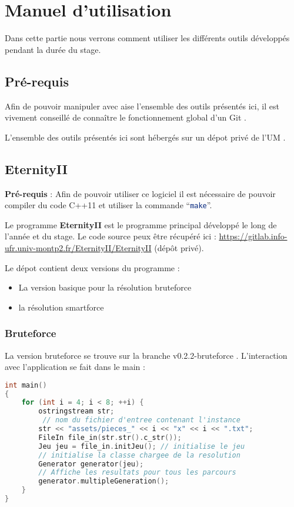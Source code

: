 \section{Manuel d'utilisation}

Dans cette partie nous verrons comment utiliser les différents outils développés pendant la durée du stage.

	\subsection{Pré-requis}
	
	Afin de pouvoir manipuler avec aise l'ensemble des outils présentés ici, il est vivement conseillé de connaître le fonctionnement global d'un Git \autocite{git}.
	
	L'ensemble des outils présentés ici sont hébergés sur un dépot privé de l'UM \autocite{gitlab:eternity}.

	\subsection{EternityII}
	
	\textbf{Pré-requis} : Afin de pouvoir utiliser ce logiciel il est nécessaire de pouvoir compiler du code C++11 et utiliser la commande \enquote{\lstinline[columns=fixed,language=bash]{make}}.
	
	Le programme \textbf{EternityII} est le programme principal développé le long de l'année et du stage. Le code source peux être récupéré ici : \url{https://gitlab.info-ufr.univ-montp2.fr/EternityII/EternityII} (dépôt privé).
	
	Le dépot contient deux versions du programme :
	
	\begin{itemize}
		\item La version basique pour la résolution bruteforce
		\item la résolution smartforce
	\end{itemize}

	\subsubsection{Bruteforce}
	
	La version bruteforce se trouve sur la branche v0.2.2-bruteforce \autocite{gitlab:eternity_bruteforce}. L'interaction avec l'application se fait dans le main :
	
	\begin{lstlisting}[language=c++, caption={Parcours bruteforce sur plusieurs tailles du plateau, en affichant tous les résultats des différents parcours}]
int main()
{
    for (int i = 4; i < 8; ++i) {
        ostringstream str;
         // nom du fichier d'entree contenant l'instance
        str << "assets/pieces_" << i << "x" << i << ".txt";
        FileIn file_in(str.str().c_str());
        Jeu jeu = file_in.initJeu(); // initialise le jeu
        // initialise la classe chargee de la resolution
        Generator generator(jeu); 
        // Affiche les resultats pour tous les parcours
        generator.multipleGeneration(); 
    }
}
	\end{lstlisting}
	
